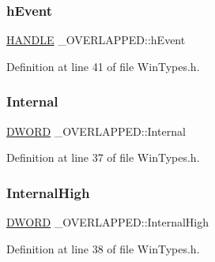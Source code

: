 \subsubsection{\texorpdfstring{h\+Event}{hEvent}}
{\footnotesize\ttfamily \hyperlink{CatCaloProto40MHz_2inc_2WinTypes_8h_aa8c0374618b33785ccb02f74bcfebc46}{H\+A\+N\+D\+LE} \+\_\+\+O\+V\+E\+R\+L\+A\+P\+P\+E\+D\+::h\+Event}



Definition at line 41 of file Win\+Types.\+h.

\mbox{\label{struct__OVERLAPPED_a2253d58d3120adff7f6d0242400bc7b4}} 
\subsubsection{\texorpdfstring{Internal}{Internal}}
{\footnotesize\ttfamily \hyperlink{CatCaloProto40MHz_2inc_2WinTypes_8h_ad342ac907eb044443153a22f964bf0af}{D\+W\+O\+RD} \+\_\+\+O\+V\+E\+R\+L\+A\+P\+P\+E\+D\+::\+Internal}



Definition at line 37 of file Win\+Types.\+h.

\mbox{\label{struct__OVERLAPPED_a577d8d492b8872fb1840947e2d2b06a7}} 
\subsubsection{\texorpdfstring{Internal\+High}{InternalHigh}}
{\footnotesize\ttfamily \hyperlink{CatCaloProto40MHz_2inc_2WinTypes_8h_ad342ac907eb044443153a22f964bf0af}{D\+W\+O\+RD} \+\_\+\+O\+V\+E\+R\+L\+A\+P\+P\+E\+D\+::\+Internal\+High}



Definition at line 38 of file Win\+Types.\+h.

\mbox{\label{struct__OVERLAPPED_a60b84fb65a45c8383a5274b38a3f4896}} 
